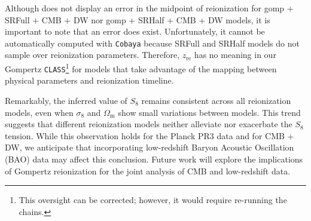\documentclass[12pt, a4paper]{article}
\newcommand{\Omegam}{\Omega_\mathrm{m}}
\newcommand{\re}{\mathrm{re}}
\begin{document}
Although  does not display an error in the midpoint
of reionization for gomp + SRFull + CMB + DW nor gomp + SRHalf + CMB +
DW models, it is important to note that an error does exist.
Unfortunately, it cannot be automatically computed with \texttt{Cobaya}
because SRFull and SRHalf models do not sample over reionization
parameters.
Therefore, $z_\re$ has no meaning in our Gompertz
\texttt{CLASS}\footnote{This oversight can be corrected; however, it
would require re-running the chains.} for models that take advantage of
the mapping between physical parameters and reionization timeline.

Remarkably, the inferred value of $S_8$ remains consistent across all
reionization models, even when $\sigma_8$ and $\Omegam$ show small
variations between models.
This trend suggests that different reionization models neither alleviate
nor exacerbate the $S_8$ tension.
While this observation holds for the Planck PR3 data and for CMB + DW,
we anticipate that incorporating low-redshift Baryon Acoustic
Oscillation (BAO) data may affect this conclusion.
Future work will explore the implications of Gompertz reionization for
the joint analysis of CMB and low-redshift data.
\end{document}
